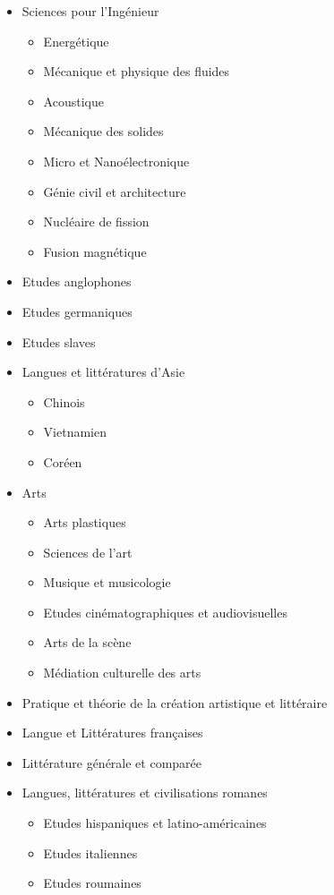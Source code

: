 	\label{ed-353-sciences-pour-lingenieur-mecanique-physique-micro-et-nanoelectronique}

		\begin{itemize}
		\item Sciences pour l'Ingénieur
			\begin{itemize}
			\item Energétique
			\item Mécanique et physique des fluides 
			\item Acoustique
			\item Mécanique des solides
			\item Micro et Nanoélectronique
			\item Génie civil et architecture
			\item Nucléaire de fission 
			\item Fusion magnétique
			\end{itemize}
		\end{itemize}

	\label{ed-354-langues-lettres-et-arts}

		\begin{itemize}
		\item Etudes anglophones
		\item Etudes germaniques
		\item Etudes slaves
		\item Langues et littératures d'Asie
			\begin{itemize}
			\item Chinois
			\item Vietnamien
			\item Coréen
			\end{itemize}
        	\item Arts
            		\begin{itemize}
            		\item Arts plastiques 
            		\item Sciences de l'art
            		\item Musique et musicologie
            		\item Etudes cinématographiques et audiovisuelles
            		\item Arts de la scène
            		\item Médiation culturelle des arts
            		\end{itemize}
        	\item Pratique et théorie de la création artistique et littéraire
		\item Langue et Littératures françaises
		\item Littérature générale et comparée
		\item Langues, littératures et civilisations romanes 
			\begin{itemize}
			\item Etudes hispaniques et latino-américaines
			\item Etudes italiennes
			\item Etudes roumaines
			\end{itemize}
		\end{itemize}

